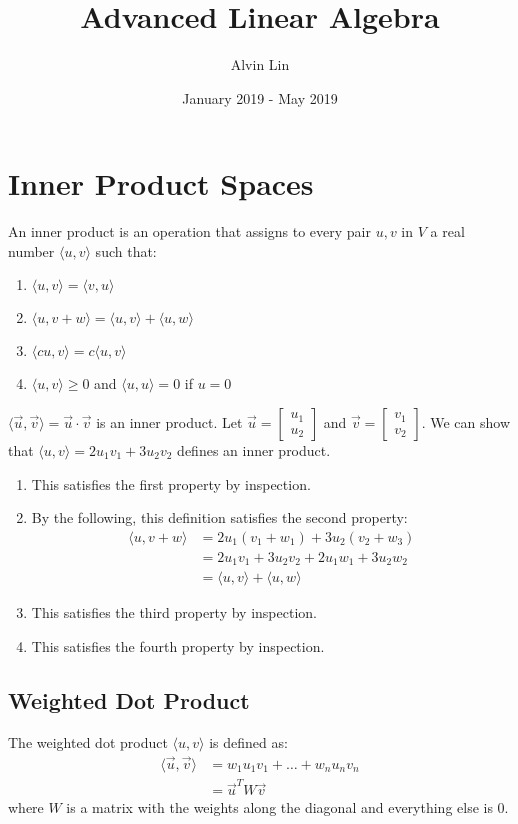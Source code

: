 \documentclass{math}
\title{Advanced Linear Algebra}
\author{Alvin Lin}
\date{January 2019 - May 2019}
\begin{document}
\maketitle

\section*{Inner Product Spaces}
An inner product is an operation that assigns to every pair \( u,v \) in \( V \)
a real number \( \langle u,v\rangle \) such that:
\begin{enumerate}
  \item \( \langle u,v\rangle = \langle v,u\rangle \)
  \item \( \langle u,v+w\rangle = \langle u,v\rangle+\langle u,w\rangle \)
  \item \( \langle cu,v\rangle = c\langle u,v\rangle \)
  \item \( \langle u,v\rangle \ge 0 \) and \( \langle u,u\rangle = 0 \) if
    \( u = 0 \)
\end{enumerate}
\( \langle \vec{u},\vec{v}\rangle = \vec{u}\cdot\vec{v} \) is an inner product.
Let \( \vec{u} = \begin{bmatrix}u_1 \\ u_2\end{bmatrix} \) and \( \vec{v} =
\begin{bmatrix}v_1 \\ v_2\end{bmatrix} \). We can show that
\( \langle u,v\rangle = 2u_1v_1+3u_2v_2 \) defines an inner product.
\begin{enumerate}
  \item This satisfies the first property by inspection.
  \item By the following, this definition satisfies the second property:
  \begin{align*}
    \langle u,v+w\rangle &= 2u_1(v_1+w_1)+3u_2(v_2+w_3) \\
    &= 2u_1v_1+3u_2v_2+2u_1w_1+3u_2w_2 \\
    &= \langle u,v\rangle+\langle u,w\rangle
  \end{align*}
  \item This satisfies the third property by inspection.
  \item This satisfies the fourth property by inspection.
\end{enumerate}

\subsection*{Weighted Dot Product}
The weighted dot product \( \langle u,v\rangle \) is defined as:
\begin{align*}
  \langle \vec{u},\vec{v}\rangle &= w_1u_1v_1+\dots+w_nu_nv_n \\
  &= \vec{u}^TW\vec{v}
\end{align*}
where \( W \) is a matrix with the weights along the diagonal and everything
else is 0.
\end{document}

